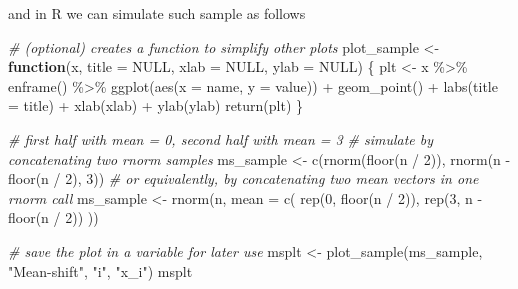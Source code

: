\documentclass[
  oneside]{book}
\newenvironment{Shaded}{\begin{snugshade}}{\end{snugshade}}
\newcommand{\AttributeTok}[1]{\textcolor[rgb]{0.77,0.63,0.00}{#1}}
\newcommand{\CommentTok}[1]{\textcolor[rgb]{0.56,0.35,0.01}{\textit{#1}}}
\newcommand{\ConstantTok}[1]{\textcolor[rgb]{0.00,0.00,0.00}{#1}}
\newcommand{\ControlFlowTok}[1]{\textcolor[rgb]{0.13,0.29,0.53}{\textbf{#1}}}
\newcommand{\DecValTok}[1]{\textcolor[rgb]{0.00,0.00,0.81}{#1}}
\newcommand{\FunctionTok}[1]{\textcolor[rgb]{0.00,0.00,0.00}{#1}}
\newcommand{\NormalTok}[1]{#1}
\newcommand{\OtherTok}[1]{\textcolor[rgb]{0.56,0.35,0.01}{#1}}
\newcommand{\SpecialCharTok}[1]{\textcolor[rgb]{0.00,0.00,0.00}{#1}}
\newcommand{\StringTok}[1]{\textcolor[rgb]{0.31,0.60,0.02}{#1}}
\begin{document}
and in R we can simulate such sample as follows

\begin{Shaded}
\begin{Highlighting}[]
\CommentTok{\# (optional) creates a function to simplify other plots}
\NormalTok{plot\_sample }\OtherTok{\textless{}{-}} \ControlFlowTok{function}\NormalTok{(x, }\AttributeTok{title =} \ConstantTok{NULL}\NormalTok{, }\AttributeTok{xlab =} \ConstantTok{NULL}\NormalTok{, }\AttributeTok{ylab =} \ConstantTok{NULL}\NormalTok{) \{}
\NormalTok{  plt }\OtherTok{\textless{}{-}}\NormalTok{ x }\SpecialCharTok{\%\textgreater{}\%}
    \FunctionTok{enframe}\NormalTok{() }\SpecialCharTok{\%\textgreater{}\%}
    \FunctionTok{ggplot}\NormalTok{(}\FunctionTok{aes}\NormalTok{(}\AttributeTok{x =}\NormalTok{ name, }\AttributeTok{y =}\NormalTok{ value)) }\SpecialCharTok{+}
    \FunctionTok{geom\_point}\NormalTok{() }\SpecialCharTok{+}
    \FunctionTok{labs}\NormalTok{(}\AttributeTok{title =}\NormalTok{ title) }\SpecialCharTok{+}
    \FunctionTok{xlab}\NormalTok{(xlab) }\SpecialCharTok{+}
    \FunctionTok{ylab}\NormalTok{(ylab)}
  \FunctionTok{return}\NormalTok{(plt)}
\NormalTok{\}}

\CommentTok{\# first half with mean = 0, second half with mean = 3}
\CommentTok{\# simulate by concatenating two rnorm samples}
\NormalTok{ms\_sample }\OtherTok{\textless{}{-}} \FunctionTok{c}\NormalTok{(}\FunctionTok{rnorm}\NormalTok{(}\FunctionTok{floor}\NormalTok{(n }\SpecialCharTok{/} \DecValTok{2}\NormalTok{)), }\FunctionTok{rnorm}\NormalTok{(n }\SpecialCharTok{{-}} \FunctionTok{floor}\NormalTok{(n }\SpecialCharTok{/} \DecValTok{2}\NormalTok{), }\DecValTok{3}\NormalTok{))}
\CommentTok{\# or equivalently, by concatenating two mean vectors in one rnorm call}
\NormalTok{ms\_sample }\OtherTok{\textless{}{-}} \FunctionTok{rnorm}\NormalTok{(n, }\AttributeTok{mean =} \FunctionTok{c}\NormalTok{(}
  \FunctionTok{rep}\NormalTok{(}\DecValTok{0}\NormalTok{, }\FunctionTok{floor}\NormalTok{(n }\SpecialCharTok{/} \DecValTok{2}\NormalTok{)),}
  \FunctionTok{rep}\NormalTok{(}\DecValTok{3}\NormalTok{, n }\SpecialCharTok{{-}} \FunctionTok{floor}\NormalTok{(n }\SpecialCharTok{/} \DecValTok{2}\NormalTok{))}
\NormalTok{))}

\CommentTok{\# save the plot in a variable for later use}
\NormalTok{msplt }\OtherTok{\textless{}{-}} \FunctionTok{plot\_sample}\NormalTok{(ms\_sample, }\StringTok{"Mean{-}shift"}\NormalTok{, }\StringTok{"i"}\NormalTok{, }\StringTok{"x\_i"}\NormalTok{)}
\NormalTok{msplt}
\end{Highlighting}
\end{Shaded}
\end{document}
